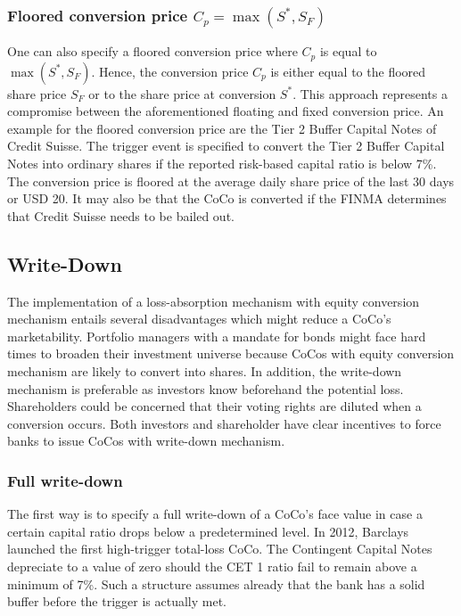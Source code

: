 \subsubsection*{Floored conversion price $C_p = \max\left( S^*, S_F \right)$}
One can also specify a floored conversion price where $C_p$ is equal to $\max\left( S^*, S_F \right)$. Hence, the conversion price $C_p$ is either equal to the floored share price $S_F$ or to the share price at conversion $S^*$. This approach represents a compromise between the aforementioned floating and fixed conversion price. \citep{de2014handbook} An example for the floored conversion price are the Tier 2 Buffer Capital Notes of Credit Suisse. %
The trigger event is specified to convert the Tier 2 Buffer Capital Notes into ordinary shares if the reported risk-based capital ratio is below 7\%. The conversion price is floored at the average daily share price of the last 30 days or USD 20. It may also be that the CoCo is converted if the FINMA determines that Credit Suisse needs to be bailed out. \citep{creditsuisse2011}

\subsection{Write-Down}
The implementation of a loss-absorption mechanism with equity conversion mechanism entails several disadvantages which might reduce a CoCo's marketability. Portfolio managers with a mandate for bonds might face hard times to broaden their investment universe because CoCos with equity conversion mechanism are likely to convert into shares. In addition, the write-down mechanism is preferable as investors know beforehand the potential loss. Shareholders could be concerned that their voting rights are diluted when a conversion occurs. Both investors and shareholder have clear incentives to force banks to issue CoCos with write-down mechanism.  

\subsubsection*{Full write-down}
The first way is to specify a full write-down of a CoCo's face value in case a certain capital ratio drops below a predetermined level. \citep{de2014handbook} In 2012, Barclays launched the first high-trigger total-loss CoCo. The Contingent Capital Notes depreciate to a value of zero should the CET 1 ratio fail to remain above a minimum of 7\%. Such a structure assumes already that the bank has a solid buffer before the trigger is actually met. \citep{barclays2010}

